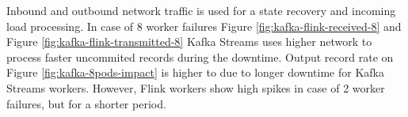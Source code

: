 Inbound and outbound network traffic is used for a state recovery and
incoming load processing.
In case of 8 worker failures Figure \ref{fig:kafka-flink-received-8} and Figure \ref{fig:kafka-flink-transmitted-8}
Kafka Streams uses higher network to process faster uncommited records during the downtime.
Output record rate on Figure  \ref{fig:kafka-8pods-impact} is higher to due to longer downtime for
Kafka Streams workers.
However, Flink workers show high spikes in case of 2 worker failures, but for a shorter period.

